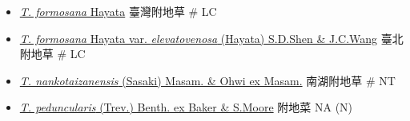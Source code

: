 \begin{itemize}
  \begin{itemize}
        \item[] \href{http://www.theplantlist.org/tpl1.1/search?q=Trigonotis+formosana}{\textit{T. formosana} Hayata}   臺灣附地草  \# LC
        \item[] \href{http://www.theplantlist.org/tpl1.1/search?q=Trigonotis+formosana+var.+elevatovenosa}{\textit{T. formosana} Hayata var. \textit{elevatovenosa} (Hayata) S.D.Shen \& J.C.Wang}   臺北附地草  \# LC
        \item[] \href{http://www.theplantlist.org/tpl1.1/search?q=Trigonotis+nankotaizanensis}{\textit{T. nankotaizanensis} (Sasaki) Masam. \& Ohwi ex Masam.}   南湖附地草  \# NT
        \item[] \href{http://www.theplantlist.org/tpl1.1/search?q=Trigonotis+peduncularis}{\textit{T. peduncularis} (Trev.) Benth. ex Baker \& S.Moore}   附地菜   NA (N)
  \end{itemize}
  \end{itemize}
